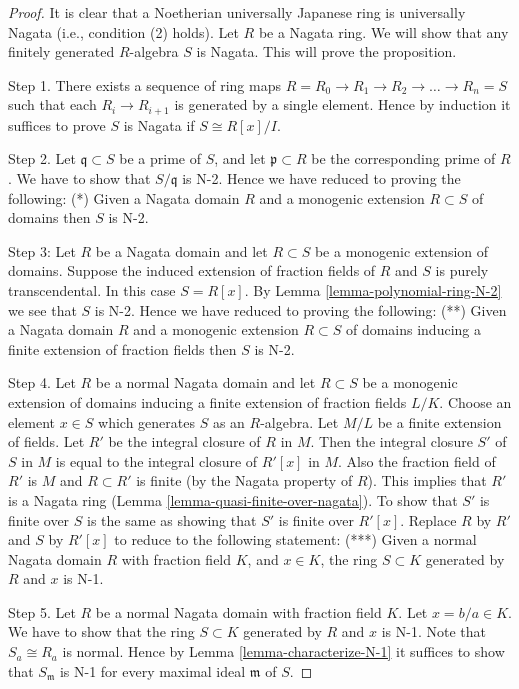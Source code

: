 \documentclass[10pt,a4paper]{amsart}
\theoremstyle{plain}
\theoremstyle{definition}
\theoremstyle{remark}
\numberwithin{equation}{subsection}
\begin{document}
\begin{proof}
It is clear that a Noetherian universally Japanese ring is universally
Nagata (i.e., condition (2) holds). Let $R$ be a Nagata ring.
We will show that any finitely generated $R$-algebra $S$ is Nagata.
This will prove the proposition.

\medskip\noindent
Step 1. There exists a sequence of ring maps
$R = R_0 \to R_1 \to R_2 \to \ldots \to R_n = S$ such that
each $R_i \to R_{i + 1}$ is generated by a single element.
Hence by induction it suffices to prove $S$ is Nagata if
$S \cong R[x]/I$.

\medskip\noindent
Step 2. Let $\mathfrak q \subset S$ be a prime of $S$, and let
$\mathfrak p \subset R$ be the corresponding prime of $R$.
We have to show that $S/\mathfrak q$ is N-2. Hence we have
reduced to proving the following:
(*) Given a Nagata domain $R$ and a monogenic extension $R \subset S$
of domains then $S$ is N-2.

\medskip\noindent
Step 3: Let $R$ be a Nagata domain and
let $R \subset S$ be a monogenic extension of domains.
Suppose the induced extension of fraction fields of $R$ and $S$
is purely transcendental. In this case $S = R[x]$. By
Lemma \ref{lemma-polynomial-ring-N-2} we see that $S$ is N-2.
Hence we have reduced to proving the following:
(**) Given a Nagata domain $R$ and a
monogenic extension $R \subset S$ of domains
inducing a finite extension of fraction fields
then $S$ is N-2.

\medskip\noindent
Step 4. Let $R$ be a normal Nagata domain and
let $R \subset S$ be a monogenic extension of domains
inducing a finite extension of fraction fields $L/K$.
Choose an element $x \in S$
which generates $S$ as an $R$-algebra. Let $M/L$
be a finite extension of fields.
Let $R'$ be the integral closure of $R$ in $M$.
Then the integral closure $S'$ of $S$ in $M$ is equal to the integral
closure of $R'[x]$ in $M$.
Also the fraction field of $R'$ is $M$ and $R \subset R'$
is finite (by the Nagata property of $R$).
This implies that $R'$ is a Nagata ring
(Lemma \ref{lemma-quasi-finite-over-nagata}).
To show that $S'$ is finite over $S$ is the same as showing that
$S'$ is finite over $R'[x]$. Replace $R$ by $R'$ and $S$ by $R'[x]$
to reduce to the following statement:
(***) Given a normal Nagata domain $R$ with fraction field $K$,
and $x \in K$, the ring $S \subset K$ generated by $R$ and $x$
is N-1.

\medskip\noindent
Step 5. Let $R$ be a normal Nagata domain with fraction field $K$.
Let $x = b/a \in K$. We have to show that the ring $S \subset K$
generated by $R$ and $x$ is N-1. Note that $S_a \cong R_a$ is normal.
Hence by Lemma \ref{lemma-characterize-N-1} it suffices to show that
$S_{\mathfrak m}$ is N-1 for every maximal ideal $\mathfrak m$ of $S$.


\end{proof}
\end{document}
